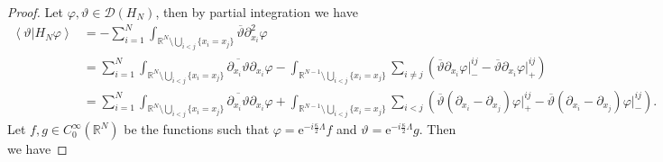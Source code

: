 \documentclass[a4paper,11pt]{article}
\newcommand{\euler}[1]{\text{e}^{#1}}
\renewcommand{\braket}[1]{\left\langle#1\right\rangle}
\newcommand{\R}{\mathbb{R}}
\numberwithin{equation}{section}
\begin{document}
	\begin{proof}
		Let $ \varphi,\vartheta\in \mathcal{D}(H_N) $, then by partial integration we have \begin{equation}
		\begin{aligned}
		\braket{\vartheta\vert H_N \varphi}&=-\sum_{i=1}^{N}\int_{\R^N\setminus\bigcup_{i<j}\{x_i=x_j\}}\overline{\vartheta} \partial_{x_i}^2\varphi\\&=\sum_{i=1}^{N}\int_{\R^N\setminus\bigcup_{i<j}\{x_i=x_j\}}\overline{\partial_{x_i}\vartheta}\partial_{x_i}\varphi-\int_{\R^{N-1}\setminus\bigcup_{i<j}\{x_i=x_j\}}\sum_{i\neq j}\left(\overline{\vartheta}\partial_{x_i}\varphi\vert^{ij}_--\overline{\vartheta}\partial_{x_i}\varphi\vert^{ij}_+\right)\\
		&=\sum_{i=1}^{N}\int_{\R^N\setminus\bigcup_{i<j}\{x_i=x_j\}}\overline{\partial_{x_i}\vartheta}\partial_{x_i}\varphi+\int_{\R^{N-1}\setminus\bigcup_{i<j}\{x_i=x_j\}}\sum_{i< j}\left(\overline{\vartheta}(\partial_{x_i}-\partial_{x_j})\varphi\vert^{ij}_+-\overline{\vartheta}(\partial_{x_i}-\partial_{x_j})\varphi\vert^{ij}_-\right).
		\end{aligned}
		\end{equation}
		Let $ f,g\in C^\infty_0(\R^N) $ be the functions such that $ \varphi=\euler{-i\frac{\kappa}{2}\Lambda}f $ and $ \vartheta=\euler{-i\frac{\kappa}{2}\Lambda}g $. Then we have
		

\end{proof}
\end{document}
